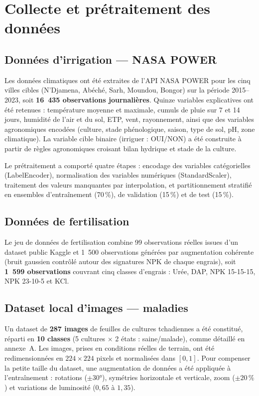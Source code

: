 \section{Collecte et prétraitement des données}
\label{sec:collecte}

\subsection{Données d'irrigation --- NASA POWER}

Les données climatiques ont été extraites de l'API NASA POWER
\cite{stackhouse2019nasa} pour les cinq villes cibles
(N'Djamena, Abéché, Sarh, Moundou, Bongor) sur la période
2015--2023, soit \textbf{16~435 observations journalières}.
Quinze variables explicatives ont été retenues : température
moyenne et maximale, cumuls de pluie sur 7 et 14 jours, humidité
de l'air et du sol, ETP, vent, rayonnement, ainsi que des
variables agronomiques encodées (culture, stade phénologique,
saison, type de sol, pH, zone climatique). La variable cible
binaire (irriguer : OUI/NON) a été construite à partir de règles
agronomiques croisant bilan hydrique et stade de la culture.

Le prétraitement a comporté quatre étapes : encodage des
variables catégorielles (LabelEncoder), normalisation des
variables numériques (StandardScaler), traitement des valeurs
manquantes par interpolation, et partitionnement stratifié
en ensembles d'entraînement (70\,\%), de validation (15\,\%) et
de test (15\,\%).

\subsection{Données de fertilisation}

Le jeu de données de fertilisation combine 99 observations
réelles issues d'un dataset public Kaggle et 1~500 observations
générées par augmentation cohérente (bruit gaussien contrôlé
autour des signatures NPK de chaque engrais), soit
\textbf{1~599 observations} couvrant cinq classes d'engrais :
Urée, DAP, NPK 15-15-15, NPK 23-10-5 et KCl.

\subsection{Dataset local d'images --- maladies}

Un dataset de \textbf{287 images} de feuilles de cultures
tchadiennes a été constitué, réparti en \textbf{10 classes}
(5 cultures $\times$ 2 états : saine/malade), comme détaillé en
annexe~A. Les images, prises en conditions réelles de terrain,
ont été redimensionnées en $224 \times 224$ pixels et normalisées
dans $[0,1]$. Pour compenser la petite taille du dataset, une
augmentation de données a été appliquée à l'entraînement :
rotations ($\pm 30°$), symétries horizontale et verticale, zoom
($\pm 20\,\%$) et variations de luminosité ($0{,}65$ à $1{,}35$).

